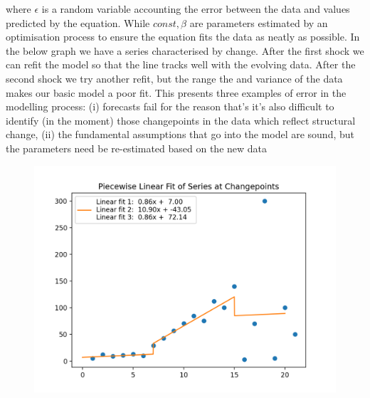\documentclass[10pt,a4paper,notitlepage, twocolumn]{article}
\begin{document}
where $\epsilon$ is a random variable accounting the error between the data and values predicted by the equation. While $const, \beta$ are parameters estimated by an optimisation process to ensure the equation fits the data as neatly as possible. In the below graph we have a series characterised by change. After the first shock we can refit the model so that the line tracks well with the evolving data. After the second shock we try another refit, but the range the and variance of the data makes our basic model a poor fit. This presents three examples of error in the modelling process: (i) forecasts fail for the reason that's it's also difficult to identify (in the moment) those changepoints in the data which reflect structural change, (ii)  the fundamental assumptions that go into the model are sound, but the parameters need be re-estimated based on the new data
\begin{figure}[H]
  \includegraphics[width=\linewidth]{./Plots/piecewise_linear_fits.png}
\end{figure}
\end{document}
